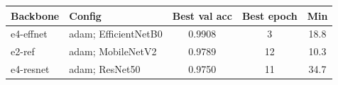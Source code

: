 \begin{tabular}{llccc}
\toprule
Backbone & Config & Best val acc & Best epoch & Min \\
\midrule
e4-effnet & adam; EfficientNetB0 & 0.9908 & 3 & 18.8\\
e2-ref & adam; MobileNetV2 & 0.9789 & 12 & 10.3\\
e4-resnet & adam; ResNet50 & 0.9750 & 11 & 34.7 \\
\bottomrule
\end{tabular}

